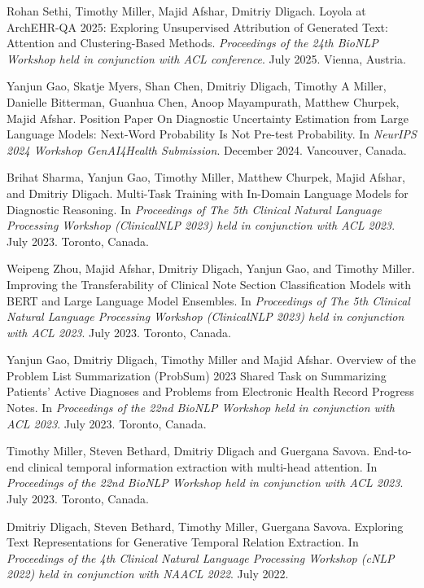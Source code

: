 \documentclass[letterpaper]{article}
\renewenvironment{itemize}{
  \begin{list}{}{
    \setlength{\leftmargin}{1.5em}
  }
}{
  \end{list}
}
\begin{document}
\begin{itemize}
\item Rohan Sethi, Timothy Miller, Majid Afshar, Dmitriy Dligach. Loyola at ArchEHR-QA 2025: Exploring Unsupervised Attribution of Generated Text: Attention and Clustering-Based Methods. \emph{Proceedings of the 24th BioNLP Workshop held in conjunction with ACL conference}. July 2025. Vienna, Austria.
\item Yanjun Gao, Skatje Myers, Shan Chen, Dmitriy Dligach, Timothy A Miller, Danielle Bitterman, Guanhua Chen, Anoop Mayampurath, Matthew Churpek, Majid Afshar. Position Paper On Diagnostic Uncertainty Estimation from Large Language Models: Next-Word Probability Is Not Pre-test Probability. In \emph{NeurIPS 2024 Workshop GenAI4Health Submission}. December 2024. Vancouver, Canada.
\item Brihat Sharma, Yanjun Gao, Timothy Miller, Matthew Churpek, Majid Afshar, and Dmitriy Dligach. Multi-Task Training with In-Domain Language Models for Diagnostic Reasoning. In \emph{Proceedings of The 5th Clinical Natural Language Processing Workshop (ClinicalNLP 2023) held in conjunction with ACL 2023}. July 2023. Toronto, Canada.
\item Weipeng Zhou, Majid Afshar, Dmitriy Dligach, Yanjun Gao, and Timothy Miller. Improving the Transferability of Clinical Note Section Classification Models with BERT and Large Language Model Ensembles. In \emph{Proceedings of The 5th Clinical Natural Language Processing Workshop (ClinicalNLP 2023) held in conjunction with ACL 2023}. July 2023. Toronto, Canada.
\item Yanjun Gao, Dmitriy Dligach, Timothy Miller and Majid Afshar. Overview of the Problem List Summarization (ProbSum) 2023 Shared Task on Summarizing Patients' Active Diagnoses and Problems from Electronic Health Record Progress Notes. In \emph{Proceedings of the 22nd BioNLP Workshop held in conjunction with ACL 2023}. July 2023. Toronto, Canada.
\item Timothy Miller, Steven Bethard, Dmitriy Dligach and Guergana Savova. End-to-end clinical temporal information extraction with multi-head attention. In \emph{Proceedings of the 22nd BioNLP Workshop held in conjunction with ACL 2023}. July 2023. Toronto, Canada.
\item Dmitriy Dligach, Steven Bethard, Timothy Miller, Guergana Savova. Exploring Text Representations for Generative Temporal Relation Extraction. In \emph{Proceedings of the 4th Clinical Natural Language Processing Workshop (cNLP 2022) held in conjunction with NAACL 2022}. July 2022.

\end{itemize}
\end{document}
